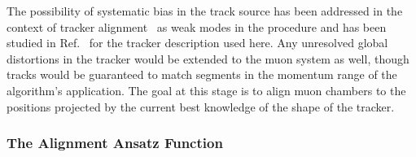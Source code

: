 The possibility of systematic bias in the track source has been
addressed in the context of tracker
alignment~\cite{Flucke:2008zz,Stoye:1047047} as weak modes in the
procedure and has been studied in Ref.~\cite{Collaboration:2009sr} for
the tracker description used here.  Any unresolved global
distortions in the tracker would be extended to the muon system as
well, though tracks would be guaranteed to match segments in the
momentum range of the algorithm's application.  The goal at this stage
is to align muon chambers to the positions projected by the current
best knowledge of the shape of the tracker.

\subsubsection{The Alignment Ansatz Function}

